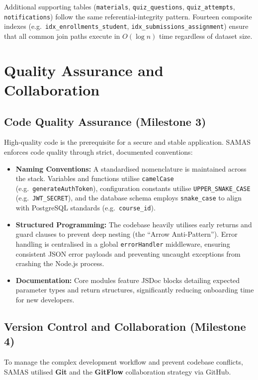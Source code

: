 \documentclass[12pt, a4paper]{report}
\begin{document}
Additional supporting tables (\texttt{materials}, \texttt{quiz\_questions}, \texttt{quiz\_attempts}, \texttt{notifications}) follow the same referential-integrity pattern. Fourteen composite indexes (e.g.\ \texttt{idx\_enrollments\_student}, \texttt{idx\_submissions\_assignment}) ensure that all common join paths execute in $O(\log n)$ time regardless of dataset size.

\chapter{Quality Assurance and Collaboration}

\section{Code Quality Assurance (Milestone 3)}
High-quality code is the prerequisite for a secure and stable application. SAMAS enforces code quality through strict, documented conventions:
\begin{itemize}[noitemsep]
    \item \textbf{Naming Conventions:} A standardised nomenclature is maintained across the stack. Variables and functions utilise \texttt{camelCase} (e.g.\ \texttt{generateAuthToken}), configuration constants utilise \texttt{UPPER\_SNAKE\_CASE} (e.g.\ \texttt{JWT\_SECRET}), and the database schema employs \texttt{snake\_case} to align with PostgreSQL standards (e.g.\ \texttt{course\_id}).
    \item \textbf{Structured Programming:} The codebase heavily utilises early returns and guard clauses to prevent deep nesting (the ``Arrow Anti-Pattern''). Error handling is centralised in a global \texttt{errorHandler} middleware, ensuring consistent JSON error payloads and preventing uncaught exceptions from crashing the Node.js process.
    \item \textbf{Documentation:} Core modules feature JSDoc blocks detailing expected parameter types and return structures, significantly reducing onboarding time for new developers.
\end{itemize}

\section{Version Control and Collaboration (Milestone 4)}
To manage the complex development workflow and prevent codebase conflicts, SAMAS utilised \textbf{Git} and the \textbf{GitFlow} collaboration strategy via GitHub.
\end{document}
